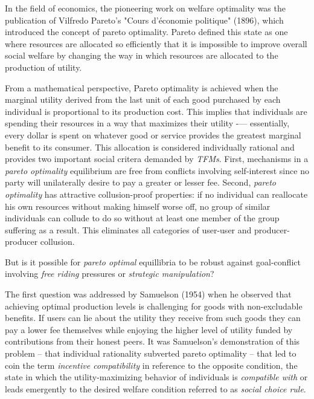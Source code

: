 
In the field of economics, the pioneering work on welfare optimality was the publication of Vilfredo Pareto’s "Cours d'économie politique" (1896), which introduced the concept of pareto optimality. Pareto defined this state as one where resources are allocated so efficiently that it is impossible to improve overall social welfare by changing the way in which resources are allocated to the production of utility.

From a mathematical perspective, Pareto optimality is achieved when the marginal utility derived from the last unit of each good purchased by each individual is proportional to its production cost. This implies that individuals are spending their resources in a way that maximizes their utility -— essentially, every dollar is spent on whatever good or service provides the greatest marginal benefit to its consumer. This allocation is considered individually rational and provides two important social critera demanded by \textit{TFMs}. First, mechanisms in a \textit{pareto optimality} equilibrium are free from conflicts involving self-interest since no party will unilaterally desire to pay a greater or lesser fee. Second, \textit{pareto optimality} has attractive collusion-proof properties: if no individual can reallocate his own resources without making himself worse off, no group of similar individuals can collude to do so without at least one member of the group suffering as a result. This eliminates all categories of user-user and producer-producer collusion.

But is it possible for \textit{pareto optimal} equillibria to be robust against goal-conflict involving \textit{free riding} pressures or \textit{strategic manipulation}?

The first question was addressed by Samuelson (1954) when he observed that achieving optimal production levels is challenging for goods with non-excludable benefits. If users can lie about the utility they receive from such goods they can pay a lower fee themselves while enjoying the higher level of utility funded by contributions from their honest peers. It was Samuelson's demonstration of this problem -- that individual rationality subverted pareto optimality -- that led \citet{hurwicz1960optimality} to coin the term \textit{incentive compatibility} in reference to the opposite condition, the state in which the utility-maximizing behavior of individuals is \textit{compatible with} or leads emergently to the desired welfare condition referred to as \textit{social choice rule}.

